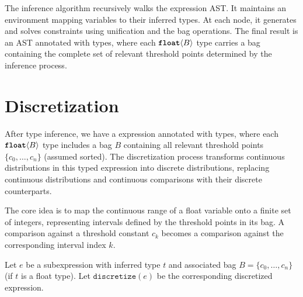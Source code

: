 \documentclass[nonacm,anonymous]{acmart}
\newcommand{\float}{\text{\ttfamily\bfseries float}}
\newcommand{\CDice}{\text{\scshape CDice}\xspace}
\begin{document}
The inference algorithm recursively walks the expression AST. It maintains an environment mapping variables to their inferred types. At each node, it generates and solves constraints using unification and the bag operations. The final result is an AST annotated with types, where each $\float\langle B \rangle$ type carries a bag containing the complete set of relevant threshold points determined by the inference process.

\section{Discretization}

After type inference, we have a \CDice expression annotated with types, where each $\float\langle B \rangle$ type includes a bag $B$ containing all relevant threshold points $\{c_0, \dots, c_n\}$ (assumed sorted). The discretization process transforms continuous distributions in this typed expression into discrete distributions, replacing continuous distributions and continuous comparisons with their discrete counterparts.

The core idea is to map the continuous range of a float variable onto a finite set of integers, representing intervals defined by the threshold points in its bag. A comparison against a threshold constant $c_k$ becomes a comparison against the corresponding interval index $k$.

Let $e$ be a subexpression with inferred type $t$ and associated bag $B = \{c_0, \dots, c_n\}$ (if $t$ is a float type). Let $\texttt{discretize}(e)$ be the corresponding discretized expression.
\end{document}
